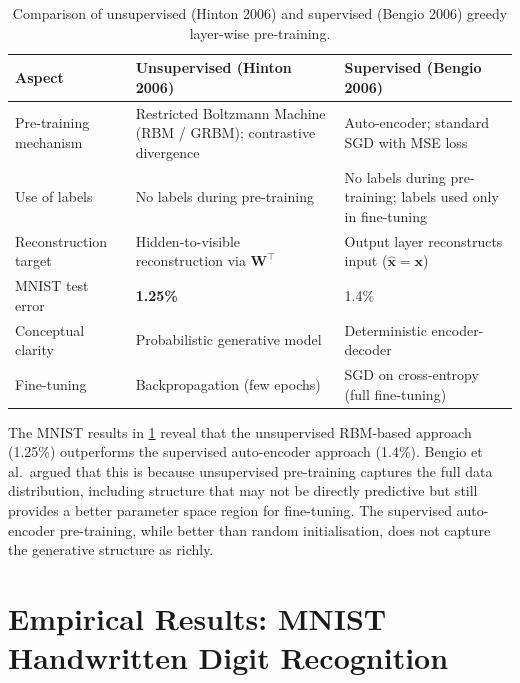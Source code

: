 \documentclass[12pt,a4paper]{article}
\newcommand{\W}{\mathbf{W}}
\newcommand{\x}{\mathbf{x}}
\begin{document}
\begin{table}[ht]
\centering
\caption{Comparison of unsupervised (Hinton 2006) and supervised (Bengio 2006)
greedy layer-wise pre-training.}
\label{tab:unsup-vs-sup}
\begin{tabularx}{\linewidth}{lXX}
\toprule
\textbf{Aspect} & \textbf{Unsupervised (Hinton 2006)} & \textbf{Supervised (Bengio 2006)} \\
\midrule
Pre-training mechanism & Restricted Boltzmann Machine (RBM / GRBM); contrastive divergence & Auto-encoder; standard SGD with MSE loss \\[4pt]
Use of labels & No labels during pre-training & No labels during pre-training; labels used only in fine-tuning \\[4pt]
Reconstruction target & Hidden-to-visible reconstruction via $\W^\top$ & Output layer reconstructs input ($\hat{\x} = \x$) \\[4pt]
MNIST test error & \textbf{1.25\%} & 1.4\% \\[4pt]
Conceptual clarity & Probabilistic generative model & Deterministic encoder-decoder \\[4pt]
Fine-tuning & Backpropagation (few epochs) & SGD on cross-entropy (full fine-tuning) \\
\bottomrule
\end{tabularx}
\end{table}

\begin{keyinsight}[title=Unsupervised Pre-training is Superior to Supervised]
  The MNIST results in \cref{tab:unsup-vs-sup} reveal that the unsupervised
  RBM-based approach (1.25\%) outperforms the supervised auto-encoder approach
  (1.4\%).  Bengio et al.\ argued that this is because unsupervised
  pre-training captures the full data distribution, including structure that
  may not be directly predictive but still provides a better parameter space
  region for fine-tuning.  The supervised auto-encoder pre-training, while
  better than random initialisation, does not capture the generative structure
  as richly.
\end{keyinsight}

\newpage

\section{Empirical Results: MNIST Handwritten Digit Recognition}
\label{sec:mnist}
\end{document}
